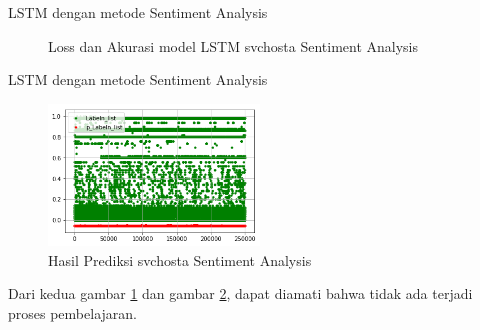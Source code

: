 \documentclass[t]{beamer}
\begin{document}
\begin{frame}{LSTM dengan metode Sentiment Analysis}
\begin{figure}[H]
\begin{subfigure}[b]{.45\linewidth}
		\end{subfigure}
		\caption{Loss dan Akurasi model LSTM svchosta Sentiment Analysis}
		\label{fig:lstms_svchosta}
	\end{figure}
\end{frame}
\begin{frame}{LSTM dengan metode Sentiment Analysis}
	\begin{figure}[H]
		\centering
		\includegraphics[width=0.5\textwidth]{public/assets/img/lstms_svchosta_pred.png}
		\caption{Hasil Prediksi svchosta Sentiment Analysis}
		\label{fig:lstms_svchosta_pred}
	\end{figure}
	\par Dari kedua gambar \ref{fig:lstms_svchosta} dan gambar \ref{fig:lstms_svchosta_pred}, dapat diamati bahwa tidak ada terjadi proses pembelajaran.
\end{frame}
\end{document}
